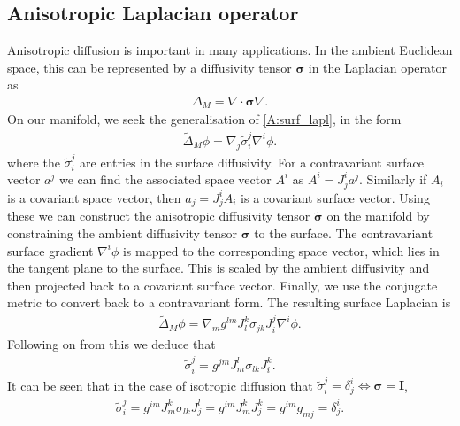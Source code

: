 \subsection{Anisotropic Laplacian operator}
\label{s:anisotropic}
Anisotropic diffusion is important in many applications. In the ambient 
Euclidean space, this can be represented by a diffusivity tensor $\mathbf{\sigma}$ 
in the Laplacian operator as
\begin{align*}
\Delta_M = \nabla \cdot \mathbf{\sigma} \nabla.
\end{align*}
On our manifold, we seek the generalisation of \ref{A:surf_lapl}, in the form
\begin{align*}
\tilde{\Delta}_M \phi = \nabla_j \tilde{\sigma}_i^j \nabla^i \phi.
\end{align*}
where the $\tilde{\sigma}_i^j$ are entries in the surface diffusivity.
For a contravariant surface vector $a^j$ we can find the associated
space vector $A^i$ as $A^i = J^i_j a^j$. Similarly if $A_i$ is a covariant space vector, then $a_j=J^i_j A_i$ is a covariant surface vector. 
Using these we can construct the anisotropic
diffusivity tensor $\tilde{\mathbf{\sigma}}$ on the manifold by constraining the ambient diffusivity tensor $\mathbf{\sigma}$ to the surface. The contravariant surface gradient $\nabla^i \phi$ is mapped to the corresponding space vector, which lies in the tangent plane to the surface. This is scaled by the ambient diffusivity and then projected back to a covariant surface vector. Finally, we use the conjugate metric to convert back to a contravariant form. The resulting surface Laplacian is 
\begin{align*}
    \tilde{\Delta}_M \phi = \nabla_m g^{lm}J^k_l\sigma_{jk}J^j_i \nabla^i \phi.
\end{align*}
Following on from this we deduce that
\begin{align*}
    \tilde{\sigma}_i^j = g^{jm} J^l_m \sigma_{lk} J^k_i.
\end{align*}
It can be seen that in the case of isotropic diffusion that $\tilde{\sigma}_i^j = \delta^i_j \Leftrightarrow \mathbf{\sigma} = \mathbf{I}$,
\begin{align*}
    \tilde{\sigma}_i^j = g^{im} J^k_m \sigma_{lk} J^l_j = g^{im} J^k_m J^k_j = g^{im} g_{mj} = \delta^i_j.
\end{align*}

